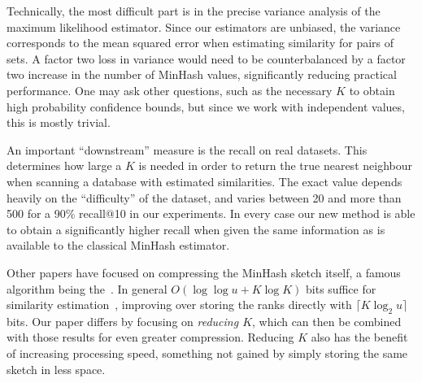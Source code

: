 Technically, the most difficult part is in the precise variance analysis of the maximum likelihood estimator.
Since our estimators are unbiased, the variance corresponds to the mean squared error when estimating similarity for pairs of sets.
A factor two loss in variance would need to be counterbalanced by a factor two increase in the number of MinHash values, significantly reducing practical performance.
One may ask other questions, such as the necessary $K$ to obtain high probability confidence bounds,
but since we work with independent values, this is mostly trivial.

An important ``downstream'' measure is the recall on real datasets.
This determines how large a $K$ is needed in order to return the true nearest neighbour when scanning a database with estimated similarities.
The exact value depends heavily on the ``difficulty'' of the dataset, and varies between 20 and more than 500 for a 90\% recall@10 in our experiments.
In every case our new method is able to obtain a significantly higher recall when given the same information as is available to the classical MinHash estimator.

Other papers have focused on compressing the MinHash sketch itself, a famous algorithm being the~\cite{flajolet2007hyperloglog}.
In general $O(\log\log u + K\log K)$ bits suffice for similarity estimation~\cite{DBLP:reference/algo/Cohen16b}, improving over storing the ranks directly with $\lceil K\log_2 u\rceil$ bits.
Our paper differs by focusing on \emph{reducing $K$}, which can then be combined with those results for even greater compression.
Reducing $K$ also has the benefit of increasing processing speed, something not gained by simply storing the same sketch in less space.
